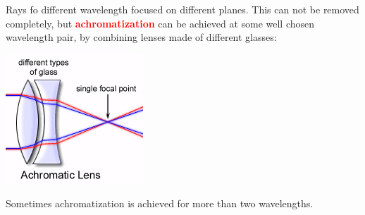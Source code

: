 \documentclass[a4paper, fontsize=8pt, landscape, DIV=1]{scrartcl}
\begin{document}
\begin{multicols*}{4}
\begin{center}
		\end{center}
		Rays fo different wavelength focused on different planes. This can not be removed completely, but \textcolor{red}{\textbf{achromatization}} can be achieved at some well chosen wavelength pair, by combining lenses made of different glasses: 
		\begin{center}
			\includegraphics[width=0.7\columnwidth]{images//ImageAcq/achromatization.png}\\
		\end{center}
		Sometimes achromatization is achieved for more than two wavelengths. 
		

\end{multicols*}
\end{document}
